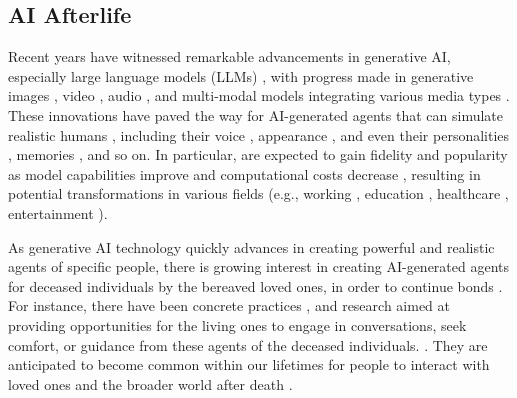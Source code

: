 \subsection{AI Afterlife}
Recent years have witnessed remarkable advancements in generative AI, especially large language models (LLMs) \cite{achiam2023gpt, touvron2023llama, touvron2023llama2, anil2023palm}, with progress made in generative images \cite{qu2023layoutllm}, video \cite{openai2024sora}, audio \cite{ghosal2023text}, and multi-modal models integrating various media types \cite{yu2024spae, girdhar2023imagebind}. These innovations have paved the way for AI-generated agents that can simulate realistic humans \cite{abramson2020creating}, including their voice \cite{Eren_Coqui_TTS_2021}, appearance \cite{musetalk, zhang2023sadtalker}, and even their personalities \cite{la2024open}, memories \cite{pataranutaporn2023living}, and so on. In particular,  are expected to gain fidelity and popularity as model capabilities improve and computational costs decrease \cite{hu2021lora,zheng2024response}, resulting in potential transformations in various fields (e.g., working \cite{brachman2024knowledge, ibmdigital}, education \cite{kazemitabaar2024codeaid,extance2023chatgpt}, healthcare \cite{yang2024talk2care}, entertainment \cite{isaza2024prompt}). %

As generative AI technology quickly advances in creating powerful and realistic agents of specific people, there is growing interest in creating AI-generated agents for deceased individuals by the bereaved loved ones, in order to continue bonds \cite{morris2024generative}. For instance, there have been concrete practices \cite{guardian2024chinese, bbc2024the, cnn2024when, projectdecember}, and research \cite{abramson2020creating, morris2024generative, brubaker2024ai} aimed at providing opportunities for the living ones to engage in conversations, seek comfort, or guidance from these agents of the deceased individuals. 
. They are anticipated to become common within our lifetimes for people to interact with loved ones and the broader world after death \cite{morris2024generative}. 

